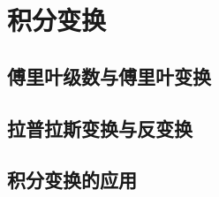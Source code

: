 \chapter{积分变换}
\section{傅里叶级数与傅里叶变换}
\label{sec:fourier_transform_and_series}



\section{拉普拉斯变换与反变换}
\label{sec:laplace_transform_and_inverse_transform}



\section{积分变换的应用}
\label{sec:integral_transform_applications}
